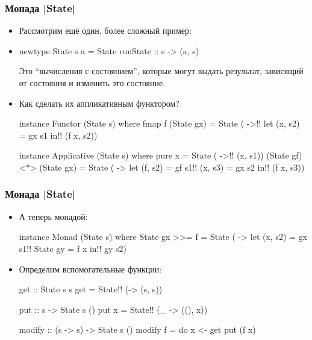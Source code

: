 \documentclass[11pt]{beamer}
\begin{document}
\begin{frame}[fragile]
  \frametitle{Монада \haskinline|State|}
  \begin{itemize}
    \item Рассмотрим ещё один, более сложный пример:
    \item
          \begin{haskellsmall}
            newtype State s a = State { runState :: s -> (a, s) }
          \end{haskellsmall}
          Это \enquote{вычисления с состоянием}, которые могут выдать результат, зависящий от состояния и изменить это состояние.
    \item Как сделать их аппликативным функтором?
          \begin{haskellsmall}
            instance Functor (State s) where
              fmap f (State gx) = State ( ->!\pause!
                let (x, s2) = gx s1
                in!\pause! (f x, s2))

            instance Applicative (State s) where
              pure x = State ( ->!\pause! (x, s1))
              (State gf) <*> (State gx) = State ( ->
                let (f, s2) = gf s1!\pause!
                (x, s3) = gx s2
                in!\pause! (f x, s3))
          \end{haskellsmall}
  \end{itemize}
\end{frame}

\begin{frame}[fragile]
  \frametitle{Монада \haskinline|State|}
  \begin{itemize}
    \item А теперь монадой:
          \begin{haskellsmall}
            instance Monad (State s) where
              State gx >>= f = State ( ->
                let (x, s2) = gx s1!\pause!
                State gy = f x
                in!\pause! gy s2)
          \end{haskellsmall}
          \pause
    \item Определим вспомогательные функции:
          \begin{haskellsmall}
            get :: State s s
            get = State!\pause! (\s -> (s, s))

            put :: s -> State s ()
            put x = State!\pause! (\_ -> ((), x))

            modify :: (s -> s) -> State s ()
            modify f = do x <- get
                          put (f x)
          \end{haskellsmall}
  \end{itemize}
\end{frame}
\end{document}
